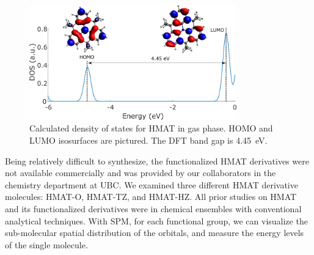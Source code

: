 \begin{figure} [h]
    \centering
    \includegraphics[width=0.8\textwidth]{pictures/HMAT_diagram.png}
    \caption{Calculated density of states for HMAT in gas phase. HOMO and LUMO isosurfaces are pictured. The DFT band gap is \SI{4.45}{eV}. }
    \label{fig:oled:dft-hmat}
\end{figure}

Being relatively difficult to synthesize, the functionalized \ac{HMAT} derivatives were not available commercially and was provided by our collaborators in the chemistry department at \ac{UBC}. We examined three different \ac{HMAT} derivative molecules: \ac{HMAT-O}, \ac{HMAT-TZ}, and \ac{HMAT-HZ}. All prior studies on \ac{HMAT} and its functionalized derivatives were in chemical ensembles with conventional analytical techniques. With \ac{SPM}, for each functional group, we can visualize the sub-molecular spatial distribution of the orbitals, and measure the energy levels of the single molecule. 







